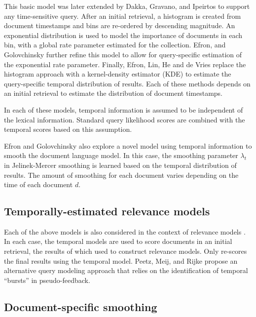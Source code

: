 \documentclass{sig-alternate}
\begin{document}
This basic model was later extended by  Dakka, Gravano, and Ipeirtos \cite{Dakka2012} to support any time-sensitive query. After an initial retrieval, a histogram is created from document timestamps and bins are re-ordered by descending magnitude. An exponential distribution is used to model the importance of documents in each bin, with a global rate parameter estimated for the collection.  Efron, and Golovchinsky \cite{Efron2011} further refine this model to allow for query-specific estimation of the exponential rate parameter.  Finally, Efron, Lin, He and de Vries \cite{Efron2014} replace the histogram approach with a kernel-density estimator (KDE) to estimate the query-specific temporal distribution of results.  Each of these methods depends on an initial retrieval to estimate the distribution of document timestamps.

In each of these models, temporal information is assumed to be independent of the lexical information. Standard query likelihood scores are combined with the temporal scores based on this assumption.

Efron and Golovchinsky \cite{Efron2011} also explore a novel model using temporal information to smooth the document language model. In this case, the smoothing parameter $\lambda_t$ in Jelinek-Mercer smoothing is learned based on the temporal distribution of results. The amount of smoothing for each document varies depending on the time of each document $d$.

\subsection{Temporally-estimated relevance models}

Each of the above models is also considered in the context of relevance models \cite{Lavrenko2001}. In each case, the temporal models are used to score documents in an initial retrieval, the results of which used to construct relevance models. Only \cite{Efron2014} re-scores the final results using the temporal model. Peetz, Meij, and Rijke \cite{Peetz2013a} propose an alternative query modeling approach that relies on the identification of temporal ``bursts'' in pseudo-feedback. 

\subsection{Document-specific smoothing}
\end{document}
